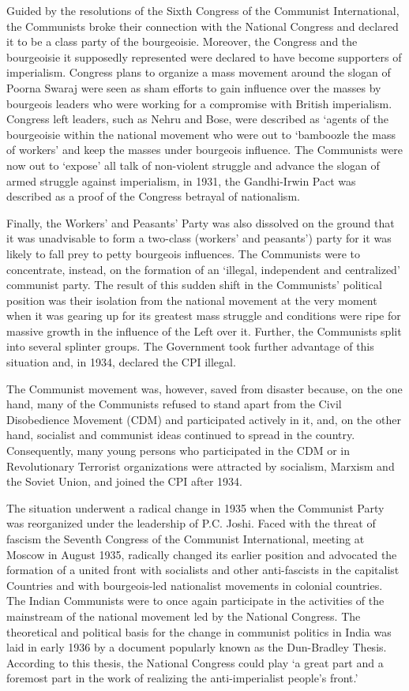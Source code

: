 \begin{multicols}{2}
Guided by the resolutions of the Sixth Congress of the Communist International, the Communists broke their connection with the National Congress and declared it to be a class party of the bourgeoisie. Moreover, the Congress and the bourgeoisie it supposedly represented were declared to have become supporters of imperialism. Congress plans to organize a mass movement around the slogan of Poorna Swaraj were seen as sham efforts to gain influence over the masses by bourgeois leaders who were working for a compromise with British imperialism. Congress left leaders, such as Nehru and Bose, were described as `agents of the bourgeoisie within the national movement who were out to `bamboozle the mass of workers' and keep the masses under bourgeois influence. The Communists were now out to `expose' all talk of non-violent struggle and advance the slogan of armed struggle against imperialism, in 1931, the Gandhi-Irwin Pact was described as a proof of the Congress betrayal of nationalism. 

Finally, the Workers' and Peasants' Party was also dissolved on the ground that it was unadvisable to form a two-class (workers' and peasants') party for it was likely to fall prey to petty bourgeois influences. The Communists were to concentrate, instead, on the formation of an `illegal, independent and centralized' communist party. The result of this sudden shift in the Communists' political position was their isolation from the national movement at the very moment when it was gearing up for its greatest mass struggle and conditions were ripe for massive growth in the influence of the Left over it. Further, the Communists split into several splinter groups. The Government took further advantage of this situation and, in 1934, declared the CPI illegal. 

The Communist movement was, however, saved from disaster because, on the one hand, many of the Communists refused to stand apart from the Civil Disobedience Movement (CDM) and participated actively in it, and, on the other hand, socialist and communist ideas continued to spread in the country. Consequently, many young persons who participated in the CDM or in Revolutionary Terrorist organizations were attracted by socialism, Marxism and the Soviet Union, and joined the CPI after 1934. 

The situation underwent a radical change in 1935 when the Communist Party was reorganized under the leadership of P.C. Joshi. Faced with the threat of fascism the Seventh Congress of the Communist International, meeting at Moscow in August 1935, radically changed its earlier position and advocated the formation of a united front with socialists and other anti-fascists in the capitalist Countries and with bourgeois-led nationalist movements in colonial countries. The Indian Communists were to once again participate in the activities of the mainstream of the national movement led by the National Congress. The theoretical and political basis for the change in communist politics in India was laid in early 1936 by a document popularly known as the Dun-Bradley Thesis. According to this thesis, the National Congress could play `a great part and a foremost part in the work of realizing the anti-imperialist people's front.' 


\end{multicols}
